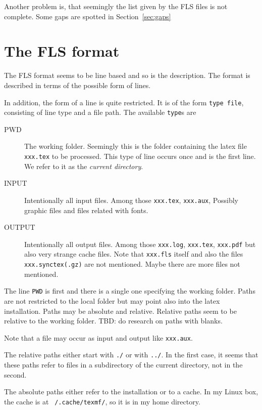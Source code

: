 \documentclass[a4paper, english]{article}%
\begin{document}
Another problem is, that seemingly the list given by the FLS files 
is not complete. 
Some gaps are spotted in Section~\ref{sec:gaps}


\section{The FLS format}\label{sec:format}

The FLS format seems to be line based and so is the description. 
The format is described in terms of the possible form of lines. 

In addition, the form of a line is quite restricted. 
It is of the form \texttt{type file}, consisting of line type and a file path. 
The available \texttt{type}s are 
%
\begin{description}
  \item[PWD] The working folder. 
  Seemingly this is the folder containing the latex file \texttt{xxx.tex} to be processed. 
  This type of line occurs once and is the first line. 
  We refer to it as the \emph{current directory}. 
  \item[INPUT] Intentionally all input files. Among those \texttt{xxx.tex}, \texttt{xxx.aux}, 
  Possibly graphic files and files related with fonts. 
  \item[OUTPUT] Intentionally all output files. 
  Among those \texttt{xxx.log}, \texttt{xxx.tex}, \texttt{xxx.pdf}
  but also very strange cache files. 
  Note that \texttt{xxx.fls} itself and also the files \texttt{xxx.synctex(.gz)} are not mentioned. %
  Maybe there are more files not mentioned. 
\end{description}

The line \texttt{PWD} is first and there is a single one specifying the working folder. 
Paths are not restricted to the local folder but may point also into the latex installation. 
Paths may be absolute and relative. 
Relative paths seem to be relative to the working folder. 
TBD\@: do research on paths with blanks. 

Note that a file may occur as input and output like \texttt{xxx.aux}. 

The relative paths either start with \texttt{./} or with \texttt{../}. 
In the first case, it seems that these paths refer to files in a subdirectory 
of the current directory, not in the second. 

The absolute paths either refer to the installation or to a cache. 
In my Linux box, the cache is at \texttt{~/.cache/texmf/}, so it is in my home directory. 
\end{document}
